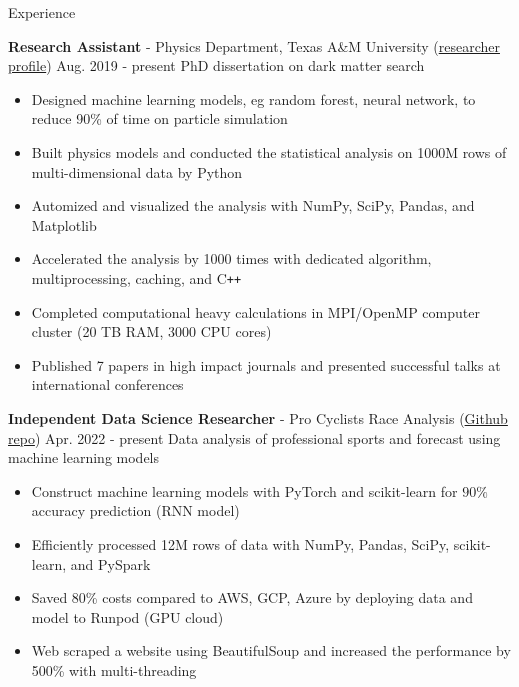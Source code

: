 \documentclass{resume}
\begin{document}
\begin{rSection}{Experience}
    \vspace{0.5em}
    \item \textbf{Research Assistant} - Physics Department, Texas A\&M University (\href{https://inspirehep.net/authors/2661451}{researcher profile}) \hfill Aug. 2019 - present
        \newline\hspace*{0.5em} {\normalsize PhD dissertation on dark matter search}
        \begin{itemize}
        \item Designed machine learning models, eg random forest, neural network, to reduce 90\% of time on particle simulation
        \item Built physics models and conducted the statistical analysis on 1000M rows of multi-dimensional data by Python
        \item Automized and visualized the analysis with NumPy, SciPy, Pandas, and Matplotlib
        \item Accelerated the analysis by 1000 times with dedicated algorithm, multiprocessing, caching, and C\texttt{++}
        \item Completed computational heavy calculations in MPI/OpenMP computer cluster (20 TB RAM, 3000 CPU cores)
        \item Published 7 papers in high impact journals and presented successful talks at international conferences
        \end{itemize}

    \vspace{0.5em}
    \item \textbf{Independent Data Science Researcher} - {Pro Cyclists Race Analysis} (\href{https://github.com/noctildon/pro_cyclists}{Github repo}) \hfill Apr. 2022 - present
        \newline\hspace*{0.5em} {\normalsize Data analysis of professional sports and forecast using machine learning models}
        \begin{itemize}
        \item Construct machine learning models with PyTorch and scikit-learn for $90\%$ accuracy prediction (RNN model)
        \item Efficiently processed 12M rows of data with NumPy, Pandas, SciPy, scikit-learn, and PySpark
        \item Saved 80\% costs compared to AWS, GCP, Azure by deploying data and model to Runpod (GPU cloud)
        \item Web scraped a website using BeautifulSoup and increased the performance by 500\% with multi-threading
        \end{itemize}


\end{rSection}
\end{document}
